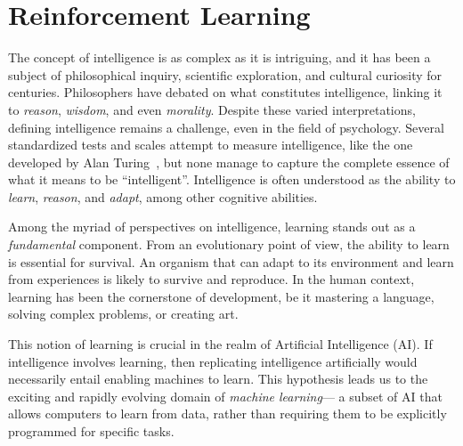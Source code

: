 \chapter{Reinforcement Learning}\label{chap:marl}

\minitoc%
\newcommand{\RS}{\mathcal{S}}
\newcommand{\RA}{\mathcal{A}}
\newcommand{\RP}{\mathcal{P}}
\newcommand{\RR}{\mathcal{R}}
\newcommand{\RE}{\mathbb{E}}

The concept of intelligence is as complex as it is intriguing, 
 and it has been a subject of philosophical inquiry, 
 scientific exploration, and cultural curiosity for centuries. 
 Philosophers have debated on what constitutes intelligence, 
 linking it to \emph{reason}, \emph{wisdom}, and even \emph{morality}. 
%
Despite these varied interpretations, 
 defining intelligence remains a challenge, 
 even in the field of psychology. 
%
Several standardized tests and scales attempt to measure intelligence,
 like the one developed by Alan Turing~\cite{Turing1950-TURCMA}, 
 but none manage to capture the complete essence of what it means to be ``intelligent''. 
 Intelligence is often understood as the ability to \emph{learn}, \emph{reason}, and \emph{adapt}, among other cognitive abilities.

Among the myriad of perspectives on intelligence, learning stands out as a \emph{fundamental} component. 
 From an evolutionary point of view, 
 the ability to learn is essential for survival. 
 An organism that can adapt to its environment and learn from experiences is likely to survive and reproduce. 
 In the human context, learning has been the cornerstone of development, be it mastering a language, solving complex problems, or creating art.

This notion of learning is crucial in the realm of Artificial Intelligence (AI). 
%
 If intelligence involves learning, 
 then replicating intelligence artificially would necessarily entail enabling machines to learn. 
 This hypothesis leads us to the exciting and rapidly evolving domain of \emph{machine learning}---
 a subset of AI that allows computers to learn from data, 
 rather than requiring them to be explicitly programmed for specific tasks.

